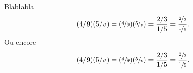 \documentclass{article}
\begin{document}
Blablabla
	\begin{equation}
		(4 / 9)(5 / v) = (\nicefrac{4}{9})(\nicefrac{5}{v}) = \frac{2/3}{1/5} = \frac{\nicefrac{2}{3}}{\nicefrac{1}{5}}.
	\end{equation}
Ou encore
	\begin{equation}
		(4 / 9)(5 / v) = (\sfrac{4}{9})(\sfrac{5}{v}) = \frac{2/3}{1/5} = \frac{\sfrac{2}{3}}{\sfrac{1}{5}}.
	\end{equation}
\end{document}
